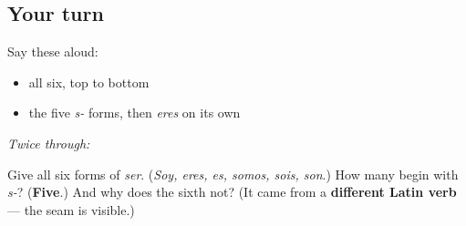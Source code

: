 \subsection*{Your turn}
Say these aloud:

\begin{itemize}
\raggedright
  \item all six, top to bottom
  \item the five \emph{s-} forms, then \emph{eres} on its own
\end{itemize}

\emph{Twice through:}

\begin{tcolorbox}[breakable,colback=teal!4,colframe=teal!35!black,title={Before you move on}]
Give all six forms of \emph{ser}. (\emph{Soy, eres, es, somos, sois, son}.) How many begin with \emph{s-}? (\textbf{Five}.) And why does the sixth not? (It came from a \textbf{different Latin verb} — the seam is visible.)
\end{tcolorbox}
